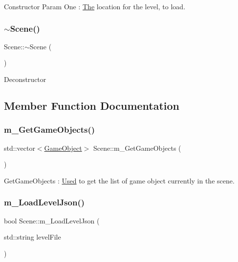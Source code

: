Constructor Param One \+: \mbox{\hyperlink{class_the}{The}} location for the level, to load. \mbox{\label{class_scene_a3b8cec2e32546713915f8c6303c951f1}} 
\subsubsection{\texorpdfstring{$\sim$\+Scene()}{~Scene()}}
{\footnotesize\ttfamily Scene\+::$\sim$\+Scene (\begin{DoxyParamCaption}{ }\end{DoxyParamCaption})}

Deconstructor 

\subsection{Member Function Documentation}
\mbox{\label{class_scene_a183135dcbd5fa1c27da8246d9a185397}} 
\subsubsection{\texorpdfstring{m\+\_\+\+Get\+Game\+Objects()}{m\_GetGameObjects()}}
{\footnotesize\ttfamily std\+::vector$<$\mbox{\hyperlink{class_game_object}{Game\+Object}}$>$ Scene\+::m\+\_\+\+Get\+Game\+Objects (\begin{DoxyParamCaption}{ }\end{DoxyParamCaption})}

Get\+Game\+Objects \+: \mbox{\hyperlink{class_used}{Used}} to get the list of game object currently in the scene. \mbox{\label{class_scene_ab44df8bc0f251a99a35b1c876cb02b46}} 
\subsubsection{\texorpdfstring{m\+\_\+\+Load\+Level\+Json()}{m\_LoadLevelJson()}}
{\footnotesize\ttfamily bool Scene\+::m\+\_\+\+Load\+Level\+Json (\begin{DoxyParamCaption}\item[{std\+::string}]{level\+File }\end{DoxyParamCaption})}

